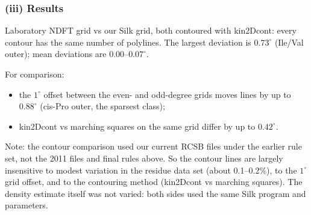 \documentclass[11pt]{article}
\begin{document}
\subsubsection*{(iii) Results}

Laboratory NDFT grid vs our Silk grid, both contoured with kin2Dcont: every contour has the same
number of polylines. The largest deviation is $0.73^\circ$ (Ile/Val outer); mean deviations are
$0.00$--$0.07^\circ$.

For comparison:
\begin{itemize}
  \item the $1^\circ$ offset between the even- and odd-degree grids moves lines by up to
    $0.88^\circ$ (cis-Pro outer, the sparsest class);
  \item kin2Dcont vs marching squares on the same grid differ by up to $0.42^\circ$.
\end{itemize}

Note: the contour comparison used our current RCSB files under the earlier rule set, not the
2011 files and final rules above. So the contour lines are largely insensitive to modest
variation in the residue data set (about 0.1--0.2\%), to the $1^\circ$ grid offset, and to the
contouring method (kin2Dcont vs marching squares). The density estimate itself was not varied:
both sides used the same Silk program and parameters.



\end{document}
